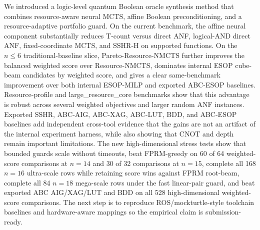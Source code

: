 \documentclass[11pt]{article}
\newcommand{\method}{Resource-NMCTS}
\newcommand{\paretomethod}{Pareto-Resource-NMCTS}
\newcommand{\largedataset}{large\_resource\_core}
\begin{document}
We introduced a logic-level quantum Boolean oracle synthesis method that
combines resource-aware neural MCTS, affine Boolean preconditioning, and a
resource-adaptive portfolio guard.  On the current benchmark, the affine neural
component substantially reduces T-count versus direct ANF, logical-AND direct
ANF, fixed-coordinate MCTS, and SSHR-H on supported functions.  On the
$n\leq 6$ traditional-baseline slice, \paretomethod{} further improves the
balanced weighted score over \method{}, dominates internal ESOP cube-beam
candidates by weighted score, and gives a clear same-benchmark improvement over
both internal ESOP-MILP and exported ABC-ESOP baselines.  Resource-profile and
\largedataset{} benchmarks show that this
advantage is robust across several weighted objectives and larger random ANF
instances.  Exported SSHR, ABC-AIG, ABC-XAG, ABC-LUT, BDD, and ABC-ESOP
baselines add independent cross-tool evidence that the gains
are not an artifact of the internal experiment harness, while also showing that
CNOT and depth remain important limitations.  The new high-dimensional stress
tests show that bounded guards scale without timeouts, beat FPRM-greedy on
60 of 64 weighted-score comparisons at $n=14$ and 30 of 32 comparisons at
$n=15$, complete all 168 $n=16$ ultra-scale rows while retaining score wins
against FPRM root-beam, complete all 84 $n=18$
mega-scale rows under the fast linear-pair guard, and beat exported ABC AIG/XAG/LUT
and BDD on all 528 high-dimensional weighted-score comparisons.
The next step is to reproduce ROS/mockturtle-style
toolchain baselines and hardware-aware mappings so the empirical claim is
submission-ready.



\end{document}
